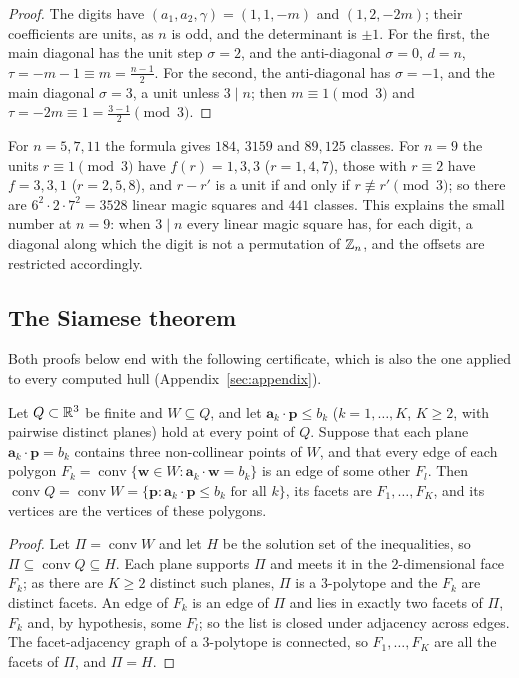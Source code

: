 \begin{proof}
The digits have $(a_1,a_2,\gamma)=(1,1,-m)$ and $(1,2,-2m)$; their coefficients are units, as $n$ is odd, and the determinant is $\pm1$.
For the first, the main diagonal has the unit step $\sigma=2$, and the anti-diagonal $\sigma=0$, $d=n$, $\tau=-m-1\equiv m=\frac{n-1}2$.
For the second, the anti-diagonal has $\sigma=-1$, and the main diagonal $\sigma=3$, a unit unless $3\mid n$; then $m\equiv1\pmod 3$ and $\tau=-2m\equiv1=\frac{3-1}2\pmod3$.
\end{proof}

For $n=5,7,11$ the formula gives $184$, $3159$ and $89{,}125$ classes.
For $n=9$ the units $r\equiv1\pmod3$ have $f(r)=1,3,3$ ($r=1,4,7$), those with $r\equiv2$ have $f=3,3,1$ ($r=2,5,8$), and $r-r'$ is a unit if and only if $r\not\equiv r'\pmod 3$; so there are $6^2\cdot2\cdot7^2=3528$ linear magic squares and $441$ classes.
This explains the small number at $n=9$: when $3\mid n$ every linear magic square has, for each digit, a diagonal along which the digit is not a permutation of $\mathbb{Z}_n$, and the offsets are restricted accordingly.

\subsection{The Siamese theorem}

Both proofs below end with the following certificate, which is also the one applied to every computed hull (Appendix~\ref{sec:appendix}).

\begin{lemma}
\label{lem:closing}
Let $Q\subset\mathbb{R}^3$ be finite and $W\subseteq Q$, and let $\mathbf a_k\cdot\mathbf p\le b_k$ ($k=1,\dots,K$, $K\ge2$, with pairwise distinct planes) hold at every point of $Q$.
Suppose that each plane $\mathbf a_k\cdot\mathbf p=b_k$ contains three non-collinear points of $W$, and that every edge of each polygon $F_k=\operatorname{conv}\{\mathbf w\in W:\mathbf a_k\cdot\mathbf w=b_k\}$ is an edge of some other $F_l$.
Then $\operatorname{conv}Q=\operatorname{conv}W=\{\mathbf p:\mathbf a_k\cdot\mathbf p\le b_k\text{ for all }k\}$, its facets are $F_1,\dots,F_K$, and its vertices are the vertices of these polygons.
\end{lemma}

\begin{proof}
Let $\Pi=\operatorname{conv}W$ and let $H$ be the solution set of the inequalities, so $\Pi\subseteq\operatorname{conv}Q\subseteq H$.
Each plane supports $\Pi$ and meets it in the $2$-dimensional face $F_k$; as there are $K\ge2$ distinct such planes, $\Pi$ is a $3$-polytope and the $F_k$ are distinct facets.
An edge of $F_k$ is an edge of $\Pi$ and lies in exactly two facets of $\Pi$, $F_k$ and, by hypothesis, some $F_l$; so the list is closed under adjacency across edges.
The facet-adjacency graph of a $3$-polytope is connected, so $F_1,\dots,F_K$ are all the facets of $\Pi$, and $\Pi=H$.
\end{proof}

